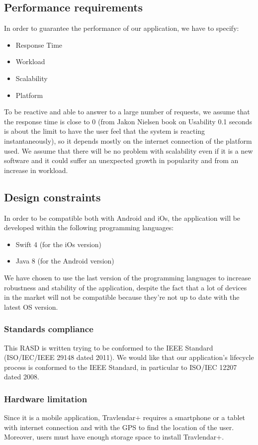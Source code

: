 \documentclass[12pt,titlepage]{article}
\begin{document}
\subsection{Performance requirements}\label{sec:mod1}
In order to guarantee the performance of our application, we have to specify:
\begin{itemize}
\item Response Time 
\item Workload
\item Scalability
\item Platform
\end{itemize}
To be reactive and able to answer to a large number of requests, we assume that the response time is close to 0 (from Jakon Nielsen book on Usability 0.1 seconds is about the limit to have the user feel that the system is reacting instantaneously), so it depends mostly on the internet connection of the platform used. 
We assume that there will be no problem with scalability even if it is a new software and it could suffer an unexpected growth in popularity and from an increase in workload.

\subsection{Design constraints}\label{sec:mod1}
In order to be compatible both with Android and iOs, the application will be developed within the following programming languages:
\begin{itemize}
\item Swift 4 (for the iOs version)
\item Java 8 (for the Android version)
\end{itemize}
We have chosen to use the last version of the programming languages to increase robustness and stability of the application, despite the fact that a lot of devices in the market will not be compatible because they're not up to date with the latest OS version.

\subsubsection{Standards compliance}\label{sec:mod1}
This RASD is written trying to be conformed to the IEEE Standard (ISO/IEC/IEEE 29148 dated 2011).
We would like that our application's lifecycle process is conformed to the IEEE Standard, in particular to ISO/IEC 12207 dated 2008.

\subsubsection{Hardware limitation}\label{sec:mod1}
Since it is a mobile application, Travlendar+ requires a smartphone or a tablet with internet connection and with the GPS to find the location of the user.
Moreover, users must have enough storage space to install Travlendar+. 
\end{document}
